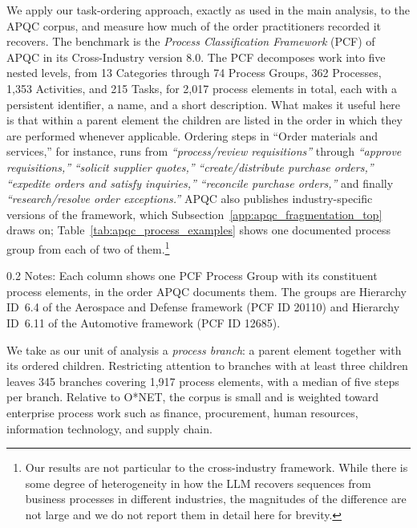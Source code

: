 We apply our task-ordering approach, exactly as used in the main analysis, to the APQC corpus, and measure how much of the
order practitioners recorded it recovers.
The benchmark is the \emph{Process Classification Framework} (PCF) of APQC in its Cross-Industry version 8.0.
The PCF decomposes work into five nested levels, from 13 Categories through 74 Process Groups, 362 Processes, 1,353 Activities, and 215 Tasks, for 2,017 process elements in total, each with a persistent identifier, a name, and a short description.
What makes it useful here is that within a parent element the children are listed in the order in which they are performed whenever applicable. Ordering steps in ``Order materials and services,'' for instance, runs from \textit{``process/review requisitions''} through \textit{``approve requisitions,''} \textit{``solicit supplier quotes,''} \textit{``create/distribute purchase orders,''} \textit{``expedite orders and satisfy inquiries,''} \textit{``reconcile purchase orders,''} and finally \textit{``research/resolve order exceptions.''}
APQC also publishes industry-specific versions of the framework, which Subsection~\ref{app:apqc_fragmentation_top} draws on; Table~\ref{tab:apqc_process_examples} shows one documented process group from each of two of them.\footnote{Our results are not particular to the cross-industry framework. While there is some degree of heterogeneity in how the LLM recovers sequences from business processes in different industries, the magnitudes of the difference are not large and we do not report them in detail here for brevity.}
\begin{table}[!t]
    \caption{Example Process Groups From Two Industry Frameworks}
    \label{tab:apqc_process_examples}
    \footnotesize
    \centering
    \begin{minipage}{1\linewidth}
\begin{spacing}{0.2}
{\fontsize{9.5pt}{10pt}\selectfont Notes: Each column shows one PCF Process Group with its constituent process elements, in the order APQC documents them. The groups are Hierarchy ID~6.4 of the Aerospace and Defense framework (PCF ID 20110) and Hierarchy ID~6.11 of the Automotive framework (PCF ID 12685).}
\end{spacing}
\end{minipage}\end{table}

We take as our unit of analysis a \emph{process branch}: a parent element together with its ordered children.
Restricting attention to branches with at least three children leaves 345 branches covering 1,917 process elements, with a median of five steps per branch.
Relative to O*NET, the corpus is small and is weighted toward enterprise process work such as finance, procurement, human resources, information technology, and supply chain.

